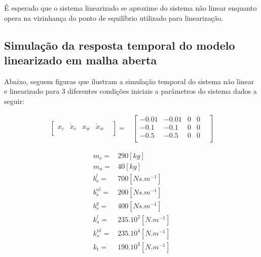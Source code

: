 \documentclass[a4paper]{ifacconf}
\begin{document}
    É esperado que o  sistema linearizado se aproxime do sistema não linear enquanto opera na vizinhança do ponto de equilíbrio utilizado para linearização. 
    
        \subsection{Simulação da resposta temporal do modelo linearizado em malha aberta}
    Abaixo, seguem figuras que ilustram a simulação temporal do sistema não linear e linearizado para 3 diferentes condições iniciais a parâmetros do sistema dados a seguir: 
    
    \begin{equation*} 
    \begin{split}
        \begin{bmatrix}
            x_c & \dot{x}_c & x_w & \dot{x}_w & \\
        \end{bmatrix}=
    \end{split}
    \begin{split}
        \begin{bmatrix}
            -0.01& -0.01& 0& 0& \\
             -0.1&  -0.1& 0& 0& \\
             -0.5&  -0.5& 0& 0&\\
        \end{bmatrix}
    \end{split}
    \end{equation*}
    
   \begin{equation} \label{eq:parametros}
        \begin{split} 
        m_s =   & 290     [kg]\\
        m_u =   & 40      [kg]\\
        b^{l}_s =  & 700  [Ns.m^{-1}]\\
        b^{nl}_s =  & 200      [Ns.m^{-1}]\\
        b^{y}_s=  & 400      [Ns.m^{-1}]\\
        k^{l}_s =  & 235.10^2 [N.m^{-1}]\\
        k^{nl}_s = & 235.10^4 [N.m^{-1}]\\
        k_t =  & 190.10^3 [N.m^{-1}]\\
        \end{split}
    \end{equation}

  
\end{document}
